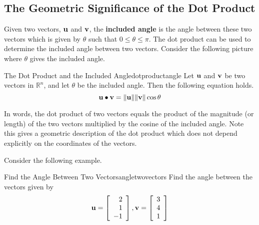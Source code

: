 \subsection{The Geometric Significance of the Dot Product}

Given two vectors, $\mathbf{u}$ and $\mathbf{v}$, the \textbf{included angle}
  is the angle between these two vectors which
is given by $\theta$ such that $0 \leq \theta \leq \pi$. The dot product can be used to
determine the included angle between two vectors. Consider the following picture where $\theta$ gives the included angle. 

\begin{center}
\end{center}

\begin{proposition}{The Dot Product and the Included Angle}{dotproductangle}
Let $\mathbf{u}$ and $\mathbf{v}$ be two vectors in $\mathbb{R}^n$, and let 
$\theta$ be the included angle. Then the following equation holds.
\begin{equation*}
\mathbf{u}\bullet \mathbf{v}=\| \mathbf{u}\| \| \mathbf{v}
\| \cos \theta 
\end{equation*}
\end{proposition}

In words, the dot product of two vectors equals the product of
the magnitude (or length) of the two vectors multiplied by the cosine of the included
angle. Note this gives a geometric description of the dot product which does
not depend explicitly on the coordinates of the vectors.

Consider the following example.

\begin{example}{Find the Angle Between Two Vectors}{angletwovectors}
Find the angle between the vectors given by 
\begin{equation*}
\mathbf{u}
=
\left[
\begin{array}{r}
2 \\
1 \\
-1 
\end{array}
\right], 
\mathbf{v}
=
\left[
\begin{array}{r}
3 \\
4 \\
1
\end{array}
\right]
\end{equation*}
\end{example}

